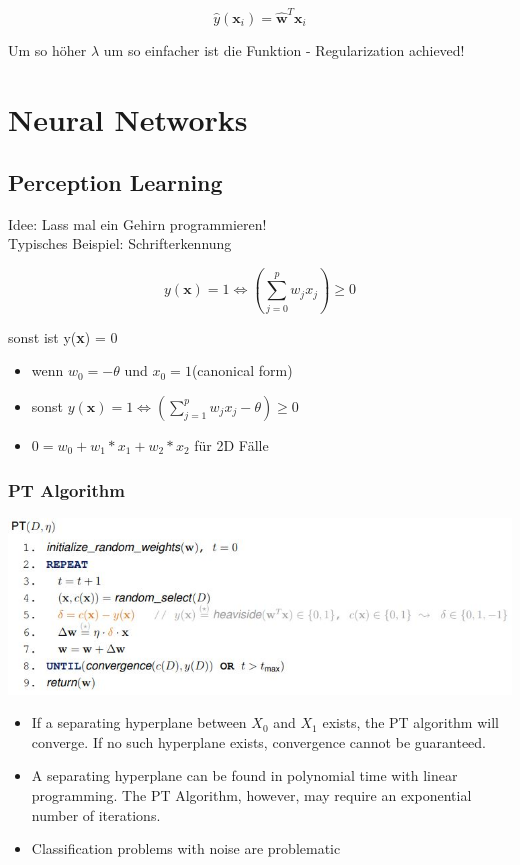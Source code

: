 \documentclass[11pt,a4paper]{article}
\begin{document}
\begin{flushleft}
$$ \hat{y}(\textbf{x}_i) = \mathbf{\hat{w}}^T \textbf{x}_i $$

Um so höher $\lambda$ um so einfacher ist die Funktion - Regularization achieved!

\section{Neural Networks}

\subsection{Perception Learning}
Idee: Lass mal ein Gehirn programmieren! \\
Typisches Beispiel: Schrifterkennung 

$$ y(\textbf{x}) = 1 \Leftrightarrow (\displaystyle\sum_{j=0}^p w_j x_j  ) \geq 0  $$

sonst ist y(\textbf{x}) = 0

\begin{itemize}
\item wenn $w_0 = -\theta$ und $x_0 = 1$(canonical form) 
\item sonst $ y(\textbf{x}) = 1 \Leftrightarrow (\displaystyle\sum_{j=1}^p w_j x_j - \theta ) \geq 0 $
\item $ 0 = w_0 + w_1 * x_1 + w_2 * x_2 $ für 2D Fälle
\end{itemize}

\subsubsection{PT Algorithm}
\includegraphics[width=\textwidth]{PT}
\begin{itemize}
\item If a separating hyperplane between $X_0$ and $X_1$ exists, the PT algorithm will
converge. If no such hyperplane exists, convergence cannot be guaranteed.
\item A separating hyperplane can be found in polynomial time with linear
programming. The PT Algorithm, however, may require an exponential
number of iterations.
\item Classification problems with noise are problematic
\end{itemize}

\end{flushleft}
\end{document}
